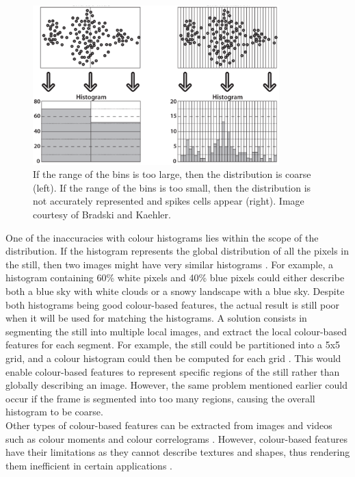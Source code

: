 \begin{figure}[h]
\centerline{\includegraphics[width=0.85\textwidth]{figures/litsurvey/histogram_bin_size.png}}
\caption{\label{fig:histogram-bin-size}If the range of the bins is too large, then the distribution is coarse (left). If the range of the bins is too small, then the distribution is not accurately represented and spikes cells appear (right). Image courtesy of Bradski and Kaehler.}
\end{figure}

One of the inaccuracies with colour histograms lies within the scope of the distribution. If the histogram represents the global distribution of all the pixels in the still, then two images might have very similar histograms \cite{petkovic2000}. For example, a histogram containing 60\% white pixels and 40\% blue pixels could either describe both a blue sky with white clouds or a snowy landscape with a blue sky. Despite both histograms being good colour-based features, the actual result is still poor when it will be used for matching the histograms. A solution consists in segmenting the still into multiple local images, and extract the local colour-based features for each segment. For example, the still could be partitioned into a 5x5 grid, and a colour histogram could then be computed for each grid \cite{yan2007review}. This would enable colour-based features to represent specific regions of the still rather than globally describing an image. However, the same problem mentioned earlier could occur if the frame is segmented into too many regions, causing the overall histogram to be coarse.\\

Other types of colour-based features can be extracted from images and videos such as colour moments and colour correlograms \cite{huang1997correlograms}. However, colour-based features have their limitations as they cannot describe textures and shapes, thus rendering them inefficient in certain applications \cite{hu2011survey}.

